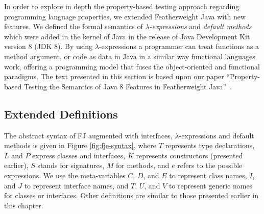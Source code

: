 \documentclass[tese,capa,english]{texufpel}
\begin{document}
In order to explore in depth the property-based testing approach regarding programming language properties, we extended Featherweight Java with new features. We defined the formal semantics of \emph{$\lambda$-expressions} and \emph{default methods} which were added in the kernel of Java in the release of Java Development Kit version 8 (JDK 8). By using $\lambda$-expressions a programmer can treat functions as a method argument, or code as data in Java in a similar way functional languages work, offering a programming model that fuses the object-oriented and functional paradigms. The text presented in this section is based upon our paper ``Property-based Testing the Semantics of Java 8 Features in Featherweight Java''~\cite{feitosa2018-3}. 

\pagebreak

\subsection{Extended Definitions}

The abstract syntax of FJ augmented with interfaces, $\lambda$-expressions and default methods is given in Figure \ref{fig:fje-syntax}, where $T$ represents type declarations, $L$ and $P$ express classes and interfaces, $K$ represents constructors (presented earlier), $S$ stands for signatures, $M$ for methods, and $e$ refers to the possible expressions. We use the meta-variables $C$, $D$, and $E$ to represent class names, $I$, and $J$ to represent interface names, and $T$, $U$, and $V$ to represent generic names for classes or interfaces. Other definitions are similar to those presented earlier in this chapter.
\end{document}
